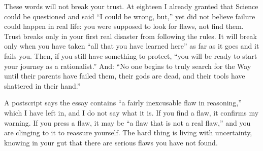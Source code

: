 These words will not break your trust. At eighteen I already granted that Science could be questioned and said ``I could be wrong, but,'' yet did not believe failure could happen in real life: you were supposed to look for flaws, not find them. Trust breaks only in your first real disaster from following the rules. It will break only when you have taken ``all that you have learned here'' as far as it goes and it fails you. Then, if you still have something to protect, ``you will be ready to start your journey as a rationalist.'' And: ``No one begins to truly search for the Way until their parents have failed them, their gods are dead, and their tools have shattered in their hand.''

A postscript says the essay contains ``a fairly inexcusable flaw in reasoning,'' which I have left in, and I do not say what it is. If you find a flaw, it confirms my warning. If you press a flaw, it may be ``a flaw that is not a real flaw,'' and you are clinging to it to reassure yourself. The hard thing is living with uncertainty, knowing in your gut that there are serious flaws you have not found. 
